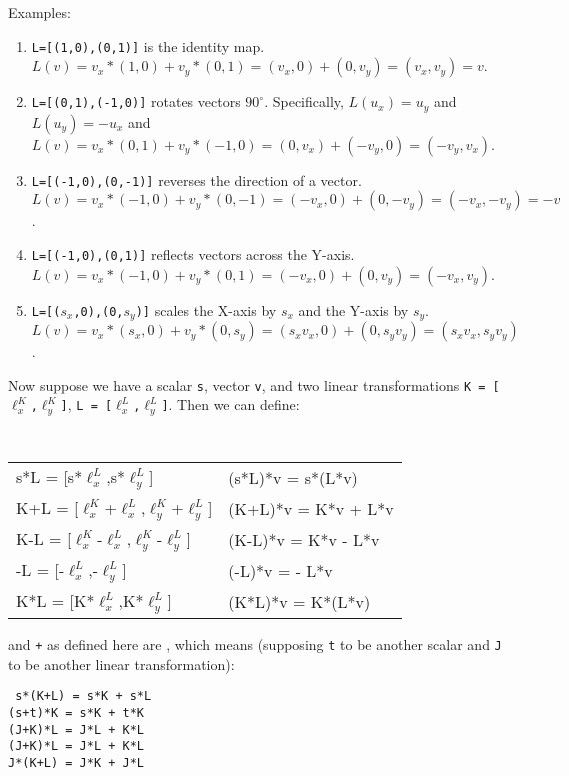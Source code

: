 \documentclass[12pt]{article}
\begin{document}
Examples:
\begin{enumerate}
\item {\tt L=[(1,0),(0,1)]} is the identity map.
$L(v)=v_x*(1,0) + v_y*(0,1) = (v_x,0)+(0,v_y) = (v_x,v_y) = v$.
\item {\tt L=[(0,1),(-1,0)]} rotates vectors $90^\circ$.
Specifically, $L(u_x)=u_y$ and $L(u_y)=-u_x$ and
$L(v)=v_x*(0,1) + v_y*(-1,0) = (0,v_x)+(-v_y,0) = (-v_y,v_x)$.
\item {\tt L=[(-1,0),(0,-1)]} reverses the direction of a vector.
$L(v)=v_x*(-1,0) + v_y*(0,-1) = (-v_x,0)+(0,-v_y) = (-v_x,-v_y) = -v$.
\item {\tt L=[(-1,0),(0,1)]} reflects vectors across the Y-axis.
$L(v)=v_x*(-1,0) + v_y*(0,1) = (-v_x,0)+(0,v_y) = (-v_x,v_y)$.
\item {\tt L=[($s_x$,0),(0,$s_y$)]} scales the X-axis by $s_x$ and
the Y-axis by $s_y$. \\
$L(v)=v_x*(s_x,0) + v_y*(0,s_y)
     = (s_x v_x,0)+(0,s_y v_y)= (s_x v_x, s_y v_y)$.
\end{enumerate}

Now suppose we have a scalar {\tt s}, vector {\tt v},
and two linear transformations
{\tt K = [$\ell^K_x$,$\ell^K_y$]},
{\tt L = [$\ell^L_x$,$\ell^L_y$]}.  Then we can define:
\begin{center}
\tt
\begin{tabular}{l@{~so that~}l}
s*L = [s*$\ell^L_x$,s*$\ell^L_y$]
	 & (s*L)*v = s*(L*v) \\[0.3ex]
K+L = [$\ell^K_x$+$\ell^L_x$,$\ell^K_y$+$\ell^L_y$]
	 & (K+L)*v = K*v + L*v \\[0.3ex]
K-L = [$\ell^K_x$-$\ell^L_x$,$\ell^K_y$-$\ell^L_y$]
	 & (K-L)*v = K*v - L*v \\[0.3ex]
-L = [-$\ell^L_x$,-$\ell^L_y$]
	 & (-L)*v = - L*v \\[0.3ex]
K*L = [K*$\ell^L_x$,K*$\ell^L_y$]
	 & (K*L)*v = K*(L*v)
\end{tabular}
\end{center}

{\tt *} and {\tt +} as defined here are , which means
(supposing {\tt t} to be another scalar and
{\tt J} to be another linear transformation):
\begin{center}
\tt
s*(K+L) = s*K + s*L \\
(s+t)*K = s*K + t*K \\
(J+K)*L = J*L + K*L \\
(J+K)*L = J*L + K*L \\
J*(K+L) = J*K + J*L
\end{center}
\end{document}
